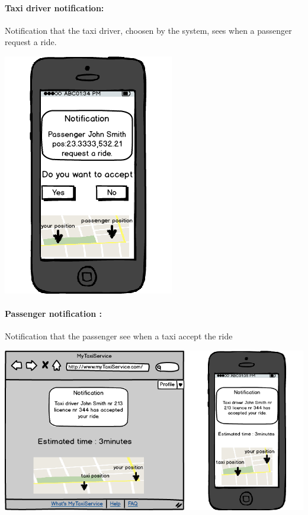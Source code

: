 \paragraph{Taxi driver notification:}
Notification that the taxi driver, choosen by the system, sees when a passenger request a ride.
\begin{center}
	\includegraphics[scale=0.5]{mockup/taxiDriverNotification.png}
\end{center}
\paragraph{Passenger notification :}
Notification that the passenger see when a taxi accept the ride
\begin{center}
	\includegraphics[width=\textwidth]{mockup/PassengerNotification.png}
\end{center}

